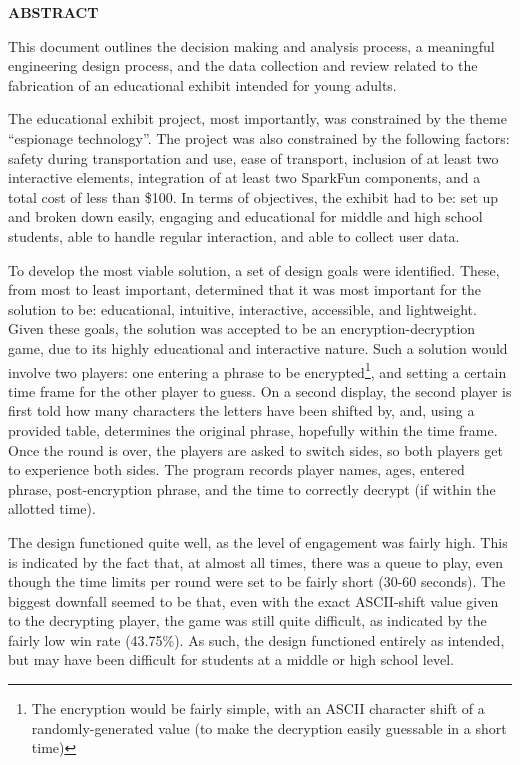\documentclass[conference]{IEEEtran}
\begin{document}
\begin{center}
\LARGE \textbf{ABSTRACT}
\end{center}
\begin{justify}
\par This document outlines the decision making and analysis process, a meaningful engineering design process, and the data collection and review related to the fabrication of an educational exhibit intended for young adults.
\par The educational exhibit project, most importantly, was constrained by the theme ``espionage technology''. The project was also constrained by the following factors: safety during transportation and use, ease of transport, inclusion of at least two interactive elements, integration of at least two SparkFun components, and a total cost of less than \$100. In terms of objectives, the exhibit had to be: set up and broken down easily, engaging and educational for middle and high school students, able to handle regular interaction, and able to collect user data.
\par To develop the most viable solution, a set of design goals were identified. These, from most to least important, determined that it was most important for the solution to be: educational, intuitive, interactive, accessible, and lightweight. Given these goals, the solution was accepted to be an encryption-decryption game, due to its highly educational and interactive nature. Such a solution would involve two players: one entering a phrase to be encrypted\footnote{The encryption would be fairly simple, with an ASCII character shift of a randomly-generated value (to make the decryption easily guessable in a short time)}, and setting a certain time frame for the other player to guess. On a second display, the second player is first told how many characters the letters have been shifted by, and, using a provided table, determines the original phrase, hopefully within the time frame. Once the round is over, the players are asked to switch sides, so both players get to experience both sides. The program records player names, ages, entered phrase, post-encryption phrase, and the time to correctly decrypt (if within the allotted time).
\par The design functioned quite well, as the level of engagement was fairly high. This is indicated by the fact that, at almost all times, there was a queue to play, even though the time limits per round were set to be fairly short (30-60 seconds). The biggest downfall seemed to be that, even with the exact ASCII-shift value given to the decrypting player, the game was still quite difficult, as indicated by the fairly low win rate (43.75\%). As such, the design functioned entirely as intended, but may have been difficult for students at a middle or high school level.
\end{justify}
\end{document}
